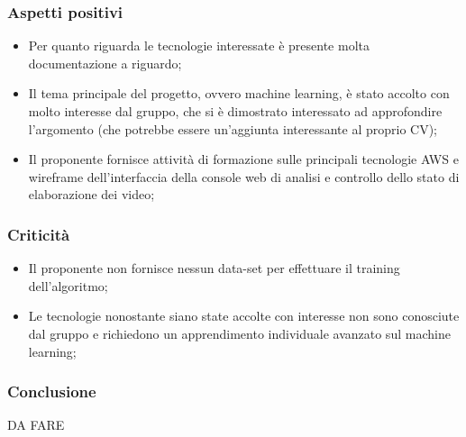     \subsubsection{Aspetti positivi}
    \begin{itemize}
    		\item Per quanto riguarda le tecnologie interessate è presente molta documentazione a riguardo;	
    		\item Il tema principale del progetto, ovvero machine learning, è stato accolto con molto interesse dal gruppo, che si è dimostrato interessato ad approfondire l'argomento (che potrebbe essere un'aggiunta interessante al proprio CV);
    		 \item Il proponente fornisce attività di formazione sulle principali tecnologie AWS e wireframe dell'interfaccia della console web di analisi e controllo dello stato di elaborazione dei video;
    \end{itemize}
    \subsubsection{Criticità}
    \begin{itemize}
    		\item Il proponente non fornisce nessun data-set per effettuare il training dell'algoritmo;
    		\item  Le tecnologie nonostante siano state accolte con interesse non sono conosciute dal gruppo e  richiedono un apprendimento individuale avanzato sul machine learning;
    \end{itemize}
    
    \subsubsection{Conclusione}
	DA FARE 